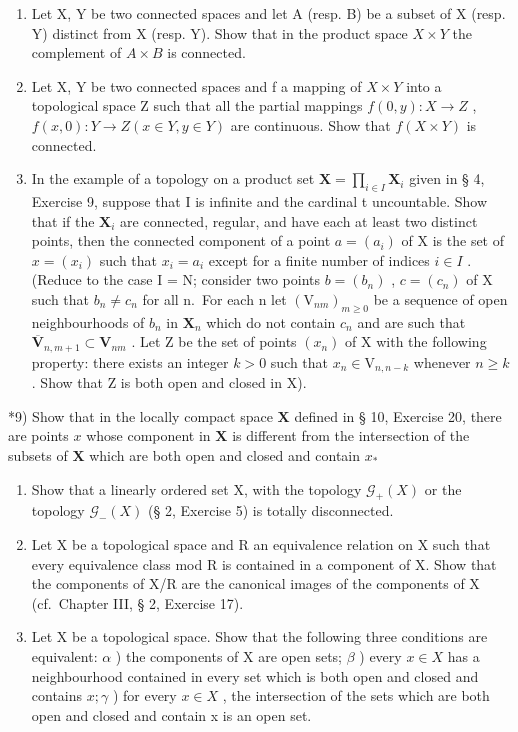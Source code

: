 \begin{enumerate}
\def\labelenumi{\arabic{enumi})}
\setcounter{enumi}{5}
\item
  Let X, Y be two connected spaces and let A (resp. B) be a subset of X (resp. Y) distinct from X (resp. Y). Show that in the product space \(X \times Y\) the complement of \(A \times B\) is connected.
\item
  Let X, Y be two connected spaces and f a mapping of \(X \times Y\) into a topological space Z such that all the partial mappings \(f(0, y) : X \to Z\) , \(f(x, 0) : Y \to Z (x \in Y, y \in Y)\) are continuous. Show that \(f(X \times Y)\) is connected.
\item
  In the example of a topology on a product set \(\mathbf{X} = \prod_{i\in I}\mathbf{X}_i\) given in § 4, Exercise 9, suppose that I is infinite and the cardinal t uncountable. Show that if the \(\mathbf{X}_i\) are connected, regular, and have each at least two distinct points, then the connected component of a point \(a = (a_i)\) of X is the set of \(x = (x_i)\) such that \(x_{i} = a_{i}\) except for a finite number of indices \(i\in I\) . (Reduce to the case I = N; consider two points \(b = (b_n)\) , \(c = (c_n)\) of X such that \(b_{n}\neq c_{n}\) for all n.~For each n let \((\mathrm{V}_{nm})_{m\geqslant 0}\) be a sequence of open neighbourhoods of \(b_{n}\) in \(\mathbf{X}_n\) which do not contain \(c_{n}\) and are such that \(\overline{\mathbf{V}}_{n,m + 1}\subset \mathbf{V}_{nm}\) . Let Z be the set of points \((x_{n})\) of X with the following property: there exists an integer \(k > 0\) such that \(x_{n}\in \mathrm{V}_{n,n - k}\) whenever \(n\geqslant k\) . Show that Z is both open and closed in X).
\end{enumerate}

*9) Show that in the locally compact space \(\mathbf{X}\) defined in § 10, Exercise 20, there are points \(x\) whose component in \(\mathbf{X}\) is different from the intersection of the subsets of \(\mathbf{X}\) which are both open and closed and contain \(x_*\)

\begin{enumerate}
\def\labelenumi{\arabic{enumi})}
\setcounter{enumi}{9}
\item
  Show that a linearly ordered set X, with the topology \(\mathcal{G}_{+}(X)\) or the topology \(\mathcal{G}_{-}(X)\) (§ 2, Exercise 5) is totally disconnected.
\item
  Let X be a topological space and R an equivalence relation on X such that every equivalence class mod R is contained in a component of X. Show that the components of X/R are the canonical images of the components of X (cf.~Chapter III, § 2, Exercise 17).
\item
  Let X be a topological space. Show that the following three conditions are equivalent: \(\alpha\) ) the components of X are open sets; \(\beta\) ) every \(x \in X\) has a neighbourhood contained in every set which is both open and closed and contains \(x; \gamma\) ) for every \(x \in X\) , the intersection of the sets which are both open and closed and contain x is an open set.
\end{enumerate}

